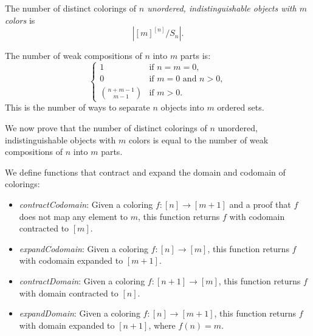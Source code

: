 \begin{definition}
  \label{def:numDistinctColoringsOfPerm}
  \leanok
  The number of distinct colorings of \emph{$n$ unordered, indistinguishable objects with $m$ colors} is
  \begin{equation*}
    |[m]^{[n]}/S_n|.
  \end{equation*}
\end{definition}

\begin{definition}
  \label{def:numWeakCompositions}
  \leanok
  The number of weak compositions of $n$ into $m$ parts is:
  \begin{equation*}
  \begin{cases}
    1 & \text{if } n = m = 0, \\
    0 & \text{if } m = 0 \text{ and } n > 0, \\
    \binom{n + m - 1}{m - 1} & \text{if } m > 0.
  \end{cases}
  \end{equation*}
  This is the number of ways to separate $n$ objects into $m$ ordered sets.
\end{definition}

We now prove that the number of distinct colorings of $n$ unordered, indistinguishable objects with $m$ colors is equal to the number of weak compositions of $n$ into $m$ parts.

\begin{definition}
  \label{def:colorings-contract-expand}
  \leanok
  We define functions that contract and expand the domain and codomain of colorings:
  \begin{itemize}
    \item \emph{contractCodomain}: Given a coloring $f : [n] \to [m + 1]$ and a proof that $f$ does not map any element to $m$, this function returns $f$ with codomain contracted to $[m]$.

    \item \emph{expandCodomain}: Given a coloring $f : [n] \to [m]$, this function returns $f$ with codomain expanded to $[m + 1]$.

    \item \emph{contractDomain}: Given a coloring $f : [n + 1] \to [m]$, this function returns $f$ with domain contracted to $[n]$.
    
    \item \emph{expandDomain}: Given a coloring $f : [n] \to [m + 1]$, this function returns $f$ with domain expanded to $[n + 1]$, where $f(n) = m$.
  \end{itemize}
\end{definition}

